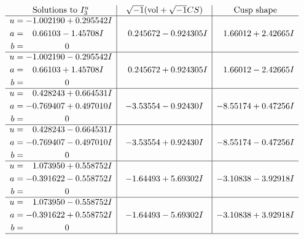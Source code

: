 \documentclass[1p]{elsarticle_modified}
\theoremstyle{definition}
\newcommand{\I}{\sqrt{-1}}
\begin{document}
$$\begin{array}{c|c|c}  
\text{Solutions to }I^u_{3}& \I (\text{vol} + \sqrt{-1}CS) & \text{Cusp shape}\\
 \hline 
\begin{aligned}
u &= -1.002190 + 0.295542 I \\
a &= \phantom{-}0.66103 - 1.45708 I \\
b &= \phantom{-0.000000 } 0\end{aligned}
 & \phantom{-}0.245672 - 0.924305 I & \phantom{-}1.66012 + 2.42665 I \\ \hline\begin{aligned}
u &= -1.002190 - 0.295542 I \\
a &= \phantom{-}0.66103 + 1.45708 I \\
b &= \phantom{-0.000000 } 0\end{aligned}
 & \phantom{-}0.245672 + 0.924305 I & \phantom{-}1.66012 - 2.42665 I \\ \hline\begin{aligned}
u &= \phantom{-}0.428243 + 0.664531 I \\
a &= -0.769407 + 0.497010 I \\
b &= \phantom{-0.000000 } 0\end{aligned}
 & -3.53554 - 0.92430 I & -8.55174 + 0.47256 I \\ \hline\begin{aligned}
u &= \phantom{-}0.428243 - 0.664531 I \\
a &= -0.769407 - 0.497010 I \\
b &= \phantom{-0.000000 } 0\end{aligned}
 & -3.53554 + 0.92430 I & -8.55174 - 0.47256 I \\ \hline\begin{aligned}
u &= \phantom{-}1.073950 + 0.558752 I \\
a &= -0.391622 - 0.558752 I \\
b &= \phantom{-0.000000 } 0\end{aligned}
 & -1.64493 + 5.69302 I & -3.10838 - 3.92918 I \\ \hline\begin{aligned}
u &= \phantom{-}1.073950 - 0.558752 I \\
a &= -0.391622 + 0.558752 I \\
b &= \phantom{-0.000000 } 0\end{aligned}
 & -1.64493 - 5.69302 I & -3.10838 + 3.92918 I\\
 \hline 
 \end{array}$$\newpage
\end{document}
